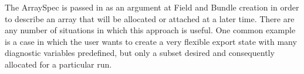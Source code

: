 

The ArraySpec is passed in as an argument at Field and 
Bundle creation in order to describe an array that will 
be allocated or attached at a later time.  There are any
number of situations in which this approach is useful.  
One common example is a case in which the user wants to create
a very flexible export state with many diagnostic variables 
predefined, but only a subset desired and consequently 
allocated for a particular run.  


